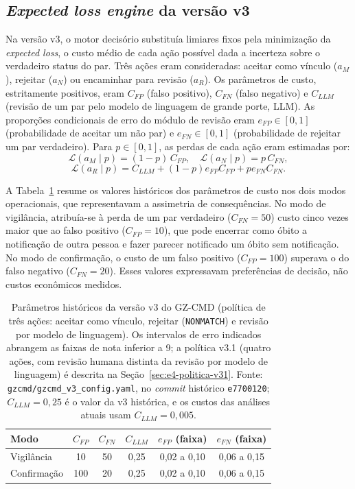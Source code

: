 \subsection{\textit{Expected loss engine} da versão v3}
\label{sec:e4-motor-politica}

Na versão v3, o motor decisório substituía limiares fixos pela minimização da \textit{expected loss}, o custo médio de cada ação possível dada a incerteza sobre o verdadeiro status do par. Três ações eram consideradas: aceitar como vínculo ($a_M$), rejeitar ($a_N$) ou encaminhar para revisão ($a_R$). Os parâmetros de custo, estritamente positivos, eram $C_{FP}$ (falso positivo), $C_{FN}$ (falso negativo) e $C_{LLM}$ (revisão de um par pelo modelo de linguagem de grande porte, LLM). As proporções condicionais de erro do módulo de revisão eram $e_{FP}\in[0,1]$ (probabilidade de aceitar um não par) e $e_{FN}\in[0,1]$ (probabilidade de rejeitar um par verdadeiro). Para $p\in[0,1]$, as perdas de cada ação eram estimadas por:
\[
\mathcal{L}(a_M\mid p)=(1-p)\,C_{FP},
\quad
\mathcal{L}(a_N\mid p)=p\,C_{FN},
\]
\[
\mathcal{L}(a_R\mid p)=C_{LLM}+(1-p)e_{FP}C_{FP}+pe_{FN}C_{FN}.
\]

A Tabela~\ref{tab:cap8-custos} resume os valores históricos dos parâmetros de custo nos dois modos operacionais, que representavam a assimetria de consequências. No modo de vigilância, atribuía-se à perda de um par verdadeiro ($C_{FN}=50$) custo cinco vezes maior que ao falso positivo ($C_{FP}=10$), que pode encerrar como óbito a notificação de outra pessoa e fazer parecer notificado um óbito sem notificação. No modo de confirmação, o custo de um falso positivo ($C_{FP}=100$) superava o do falso negativo ($C_{FN}=20$). Esses valores expressavam preferências de decisão, não custos econômicos medidos.

\begin{table}[!ht]
\centering
\caption{Parâmetros históricos da versão v3 do GZ-CMD (política de três ações: aceitar como vínculo, rejeitar (\texttt{NONMATCH}) e revisão por modelo de linguagem). Os intervalos de erro indicados abrangem as faixas de nota inferior a 9; a política v3.1 (quatro ações, com revisão humana distinta da revisão por modelo de linguagem) é descrita na Seção~\ref{sec:e4-politica-v31}. Fonte: \texttt{gzcmd/gzcmd\_v3\_config.yaml}, no \textit{commit} histórico \texttt{e7700120}; $C_{LLM}=0{,}25$ é o valor da v3 histórica, e os custos das análises atuais usam $C_{LLM}=0{,}005$.}
\label{tab:cap8-custos}
\begin{tabular}{|l|c|c|c|c|c|}
\hline
Modo & $C_{FP}$ & $C_{FN}$ & $C_{LLM}$ & $e_{FP}$ (faixa) & $e_{FN}$ (faixa) \\
\hline
Vigilância & 10 & 50 & 0,25 & 0,02 a 0,10 & 0,06 a 0,15 \\
\hline
Confirmação & 100 & 20 & 0,25 & 0,02 a 0,10 & 0,06 a 0,15 \\
\hline
\end{tabular}
\end{table}

